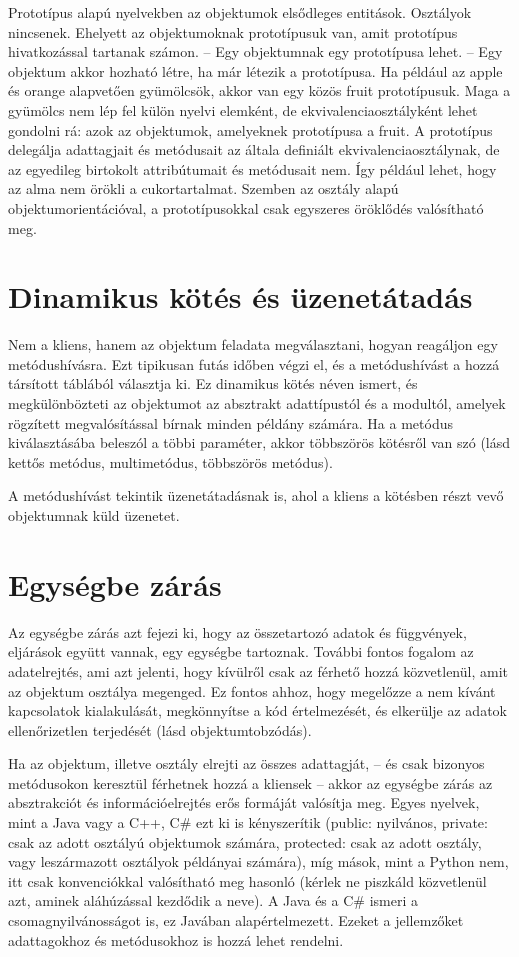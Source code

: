 \documentclass[]{thesis-ekf}
\theoremstyle{definition}
\begin{document}
	Prototípus alapú nyelvekben az objektumok elsődleges entitások. Osztályok nincsenek. Ehelyett az objektumoknak prototípusuk van, amit prototípus hivatkozással tartanak számon. -- Egy objektumnak egy prototípusa lehet. -- Egy objektum akkor hozható létre, ha már létezik a prototípusa. Ha például az apple és orange alapvetően gyümölcsök, akkor van egy közös fruit prototípusuk. Maga a gyümölcs nem lép fel külön nyelvi elemként, de ekvivalenciaosztályként lehet gondolni rá: azok az objektumok, amelyeknek prototípusa a fruit. A prototípus delegálja adattagjait és metódusait az általa definiált ekvivalenciaosztálynak, de az egyedileg birtokolt attribútumait és metódusait nem. Így például lehet, hogy az alma nem örökli a cukortartalmat. Szemben az osztály alapú objektumorientációval, a prototípusokkal csak egyszeres öröklődés valósítható meg.
	
	\section{Dinamikus kötés és üzenetátadás}
	Nem a kliens, hanem az objektum feladata megválasztani, hogyan reagáljon egy metódushívásra. Ezt tipikusan futás időben végzi el, és a metódushívást a hozzá társított táblából választja ki. Ez dinamikus kötés néven ismert, és megkülönbözteti az objektumot az absztrakt adattípustól és a modultól, amelyek rögzített megvalósítással bírnak minden példány számára. Ha a metódus kiválasztásába beleszól a többi paraméter, akkor többszörös kötésről van szó (lásd kettős metódus, multimetódus, többszörös metódus).
	
	A metódushívást tekintik üzenetátadásnak is, ahol a kliens a kötésben részt vevő objektumnak küld üzenetet.
	
	\section{Egységbe zárás}
	Az egységbe zárás azt fejezi ki, hogy az összetartozó adatok és függvények, eljárások együtt vannak, egy egységbe tartoznak. További fontos fogalom az adatelrejtés, ami azt jelenti, hogy kívülről csak az férhető hozzá közvetlenül, amit az objektum osztálya megenged. Ez fontos ahhoz, hogy megelőzze a nem kívánt kapcsolatok kialakulását, megkönnyítse a kód értelmezését, és elkerülje az adatok ellenőrizetlen terjedését (lásd objektumtobzódás).
	
	Ha az objektum, illetve osztály elrejti az összes adattagját, -- és csak bizonyos metódusokon keresztül férhetnek hozzá a kliensek -- akkor az egységbe zárás az absztrakciót és információelrejtés erős formáját valósítja meg. Egyes nyelvek, mint a Java vagy a C++, C\# ezt ki is kényszerítik (public: nyilvános, private: csak az adott osztályú objektumok számára, protected: csak az adott osztály, vagy leszármazott osztályok példányai számára), míg mások, mint a Python nem, itt csak konvenciókkal valósítható meg hasonló (kérlek ne piszkáld közvetlenül azt, aminek aláhúzással kezdődik a neve). A Java és a C\# ismeri a csomagnyilvánosságot is, ez Javában alapértelmezett. Ezeket a jellemzőket adattagokhoz és metódusokhoz is hozzá lehet rendelni.
	
\end{document}

